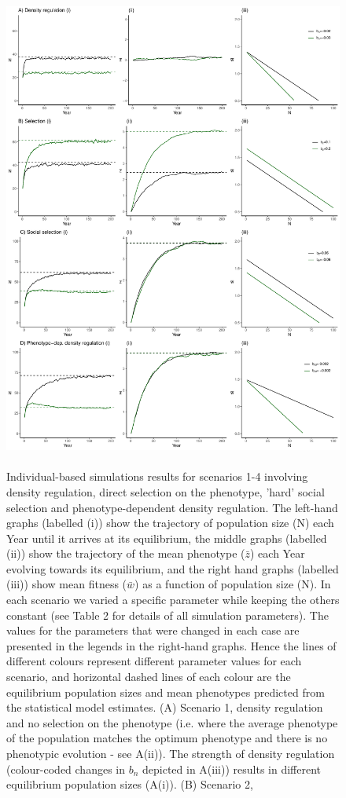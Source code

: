 \documentclass{article}
\begin{document}
\newpage
\begin{figure} [H]
	\centering
	\includegraphics[width=12cm, height=16cm]{Figures/Fig3.pdf}
	\caption{Individual-based simulations results for scenarios 1-4 involving density regulation, direct selection on the phenotype, 'hard' social selection and phenotype-dependent density regulation. The left-hand graphs (labelled (i)) show the trajectory of population size (N) each Year until it arrives at its equilibrium, the middle graphs (labelled (ii)) show the trajectory of the mean phenotype ($\bar{z}$) each Year evolving towards its equilibrium, and the right hand graphs (labelled (iii)) show mean fitness ($\bar{w}$) as a function of population size (N). In each scenario we varied a specific parameter while keeping the others constant (see Table 2 for details of all simulation parameters). The values for the parameters that were changed in each case are presented in the legends in the right-hand graphs. Hence the lines of different colours represent different parameter values for each scenario, and horizontal dashed lines of each colour are the equilibrium population sizes and mean phenotypes predicted from the statistical model estimates. (A) Scenario 1, density regulation and no selection on the phenotype (i.e. where the average phenotype of the population matches the optimum phenotype and there is no phenotypic evolution - see A(ii)). The strength of density regulation (colour-coded changes in $b_n$ depicted in A(iii)) results in different equilibrium population sizes (A(i)). (B) Scenario 2, 
}
\end{figure}
\end{document}
